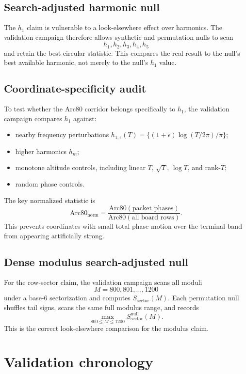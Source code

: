 \documentclass[11pt]{article}
\begin{document}
\subsection{Search-adjusted harmonic null}

The \(h_1\) claim is vulnerable to a look-elsewhere effect over harmonics. The validation campaign therefore allows synthetic and permutation nulls to scan
\[
h_1,h_2,h_3,h_4,h_5
\]
and retain the best circular statistic. This compares the real result to the null's best available harmonic, not merely to the null's \(h_1\) value.

\subsection{Coordinate-specificity audit}

To test whether the Arc80 corridor belongs specifically to \(h_1\), the validation campaign compares \(h_1\) against:
\begin{itemize}
    \item nearby frequency perturbations \(h_{1,\epsilon}(T)=\{(1+\epsilon)\log(T/2\pi)/\pi\}\);
    \item higher harmonics \(h_m\);
    \item monotone altitude controls, including linear \(T\), \(\sqrt{T}\), \(\log T\), and rank-\(T\);
    \item random phase controls.
\end{itemize}
The key normalized statistic is
\[
\mathrm{Arc80}_{\mathrm{norm}}=
\frac{\mathrm{Arc80}(\text{packet phases})}
     {\mathrm{Arc80}(\text{all board rows})}.
\]
This prevents coordinates with small total phase motion over the terminal band from appearing artificially strong.

\subsection{Dense modulus search-adjusted null}

For the row-sector claim, the validation campaign scans all moduli
\[
M=800,801,\ldots,1200
\]
under a base-6 sectorization and computes \(S_{\mathrm{sector}}(M)\). Each permutation null shuffles tail signs, scans the same full modulus range, and records
\[
\max_{800\le M\le 1200} S_{\mathrm{sector}}^{\mathrm{null}}(M).
\]
This is the correct look-elsewhere comparison for the modulus claim.

\section{Validation chronology}
\end{document}
